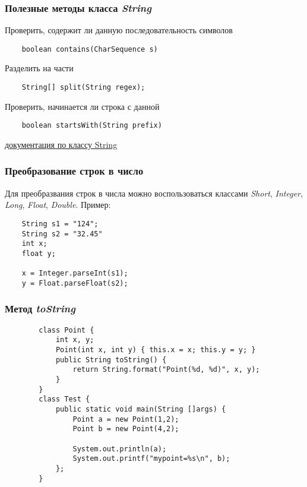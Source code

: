 \begin{frame}[fragile]
	\frametitle{Полезные методы класса \textit{String}}

	\begin{large}
	Проверить, содержит ли данную последовательность символов
	\begin{verbatim}
	boolean contains(CharSequence s)
	\end{verbatim}

	Разделить на части
	\begin{verbatim}
	String[] split(String regex);
	\end{verbatim}

	Проверить, начинается ли строка с данной
	\begin{verbatim}
	boolean startsWith(String prefix)
	\end{verbatim}

	\href{http://docs.oracle.com/javase/6/docs/api/java/lang/String.html}{документация по классу String}
	\end{large}
\end{frame}

\begin{frame}[fragile]
	\frametitle{Преобразование строк в число}

	\begin{large}
	Для преобразвания строк в числа можно воспользоваться классами \textit{Short}, \textit{Integer}, \textit{Long}, \textit{Float}, \textit{Double}.
	Пример:

	\begin{verbatim}
	String s1 = "124";
	String s2 = "32.45"
	int x;
	float y;

	x = Integer.parseInt(s1);
	y = Float.parseFloat(s2);
	\end{verbatim}

	\end{large}
\end{frame}

\begin{frame}[fragile]
	\frametitle{Метод \textit{toString}}

	\begin{verbatim}
		class Point {
		    int x, y;
		    Point(int x, int y) { this.x = x; this.y = y; }
		    public String toString() {
		        return String.format("Point(%d, %d)", x, y);
		    }
		}
		class Test {
		    public static void main(String []args) {
		        Point a = new Point(1,2);
		        Point b = new Point(4,2);

		        System.out.println(a);
		        System.out.printf("mypoint=%s\n", b);
		    };
		}
	\end{verbatim}

\end{frame}

